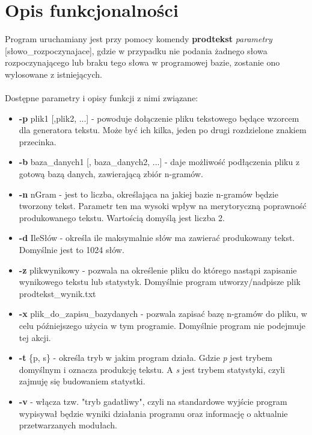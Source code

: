 \documentclass[a4paper,11pt]{article}
\begin{document}
\section{Opis funkcjonalności}
	Program uruchamiany jest przy pomocy komendy \textbf{prodtekst} \textit{parametry} [słowo\_rozpoczynajace], gdzie w przypadku nie podania żadnego słowa rozpoczynającego lub braku tego słowa w programowej bazie, zostanie ono wylosowane z istniejących. 
	\\
	\\
	Dostępne parametry i opisy funkcji z nimi związane: 
	\begin{itemize}
		\item \textbf{-p} plik1 [,plik2, ...] - powoduje dołączenie pliku tekstowego będące wzorcem dla generatora tekstu. Może być ich kilka, jeden po drugi rozdzielone znakiem przecinka. 
		
		\item \textbf{-b} baza\_danych1 [, baza\_danych2, ...] - daje możliwość podłączenia pliku z gotową bazą danych, zawierającą zbiór n-gramów. 
		
		\item \textbf{-n} nGram - jest to liczba, określająca na jakiej bazie n-gramów będzie tworzony tekst. Parametr ten ma wysoki wpływ na merytoryczną poprawność produkowanego tekstu. Wartością domyślą jest liczba 2.
		
		\item \textbf{-d} IleSłów - określa ile maksymalnie słów ma zawierać produkowany tekst. Domyślnie jest to 1024 słów.
		\item \textbf{-z} plikwynikowy - pozwala na określenie pliku do którego nastąpi zapisanie wynikowego tekstu lub statystyk. Domyślnie program utworzy/nadpisze plik prodtekst\_wynik.txt
	\item \textbf{-x} plik\_do\_zapisu\_bazydanych - pozwala zapisać bazę n-gramów do pliku, w celu późniejszego użycia w tym programie. Domyślnie program nie podejmuje tej akcji.
		\item \textbf{-t} \{p, s\} - określa tryb w jakim program działa. Gdzie \textit{p} jest trybem domyślnym i oznacza produkcję tekstu. A \textit{s} jest trybem statystyki, czyli zajmuję się budowaniem statystki.
		\item \textbf{-v} - włącza tzw. "tryb gadatliwy", czyli na standardowe wyjście program wypisywał będzie wyniki działania programu oraz informację o aktualnie przetwarzanych modułach.
	\end{itemize}
\end{document}
